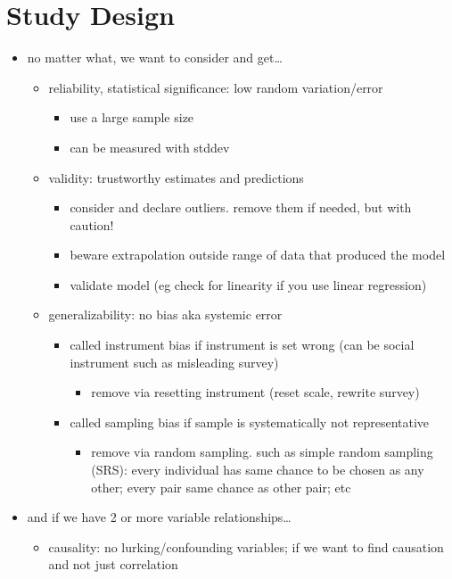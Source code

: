 \documentclass[11pt]{article}
\newcommand{\addsection}[1]{\addcontentsline{toc}{section}{#1}\section*{#1}}
\begin{document}
\newpage
\addsection{Study Design}
\begin{itemize}
  \item no matter what, we want to consider and get\dots
  \begin{itemize}
    \item reliability, statistical significance: low random variation/error
    \begin{itemize}
      \item use a large sample size
      \item can be measured with stddev
    \end{itemize}
    \item validity: trustworthy estimates and predictions
    \begin{itemize}
      \item consider and declare outliers. remove them if needed, but with caution!
      \item beware extrapolation outside range of data that produced the model
      \item validate model (eg check for linearity if you use linear regression)
    \end{itemize} 
    \item generalizability: no bias aka systemic error 
    \begin{itemize}
      \item called instrument bias if instrument is set wrong (can be social instrument such as misleading survey)
      \begin{itemize}
        \item remove via resetting instrument (reset scale, rewrite survey)
      \end{itemize}
      \item called sampling bias if sample is systematically not representative 
      \begin{itemize}
        \item remove via random sampling. such as simple random sampling (SRS): every individual has same chance to be chosen as any other; every pair same chance as other pair; etc
      \end{itemize}
    \end{itemize}
  \end{itemize}
  \item and if we have 2 or more variable relationships\dots
  \begin{itemize}
    \item causality: no lurking/confounding variables; if we want to find causation and not just correlation 

\end{itemize}
\end{itemize}
\end{document}
